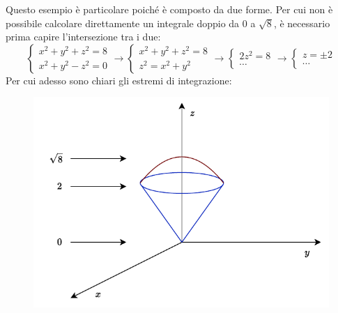 \documentclass[a4paper]{article}
\begin{document}
	Questo esempio è particolare poiché è composto da due forme. Per cui non è possibile calcolare direttamente un integrale doppio da $0$ a $\sqrt{8}$, è necessario prima capire l'intersezione tra i due:
	\begin{equation*}
		\begin{cases}
			x^{2} + y^{2} + z^{2} = 8 \\
			x^{2} + y^{2} - z^{2} = 0
		\end{cases}
		\rightarrow
		\begin{cases}
			x^{2} + y^{2} + z^{2} = 8 \\
			z^{2} = x^{2} + y^{2}
		\end{cases}
		\rightarrow
		\begin{cases}
			2z^{2} = 8 \\
			\cdots
		\end{cases}
		\rightarrow
		\begin{cases}
			z = \pm 2 \\
			\cdots
		\end{cases}
	\end{equation*}
	Per cui adesso sono chiari gli estremi di integrazione:
	\begin{figure}[!htp]
		\centering
		\includegraphics[width=.8\textwidth]{img/integrazione_per_strati_2.pdf}
	\end{figure}
\end{document}

